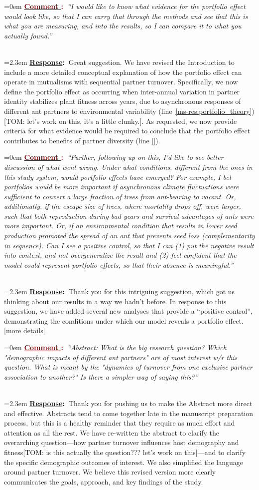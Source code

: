 \documentclass[12pt]{article}
\newcounter{cN}
\newcommand{\comment}[1]{
	\vspace{2em}
	\refstepcounter{cN} %
	\noindent \hangindent=0em \textbf{\textcolor{Maroon}{\uline{Comment \thecN}:~}}\emph{``#1''}
	}
\newcommand{\response}[1]{
	\\[0.25em]
	\hangindent=2.3em \textbf{\textcolor{NavyBlue}{\uline{Response}:~}}#1
	}
\begin{document}
\comment{I would like to know what evidence for the portfolio effect would look like, so that I can carry that through the methods and see that this is what you are measuring, and into the results, so I can compare it to what you actually found.}
\response{Great suggestion. 
	We have revised the Introduction to include a more detailed conceptual explanation of how the portfolio effect can operate in mutualisms with sequential partner turnover. 
	Specifically, we now define the portfolio effect as occurring when inter-annual variation in partner identity stabilizes plant fitness across years, due to asynchronous responses of different ant partners to environmental variability (line~\ref{ms-res:portfolio_theory})[TOM: let's work on this, it's a little clunky.].
	As requested, we now provide criteria for what evidence would be required to conclude that the portfolio effect contributes to benefits of partner diversity (line \ref{}). }

\comment{Further, following up on this, I'd like to see better discussion of what went wrong. 
Under what conditions, different from the ones in this study system, would portfolio effects have emerged? 
For example, I bet portfolios would be more important if asynchronous climate fluctuations were sufficient to convert a large fraction of trees from ant-bearing to vacant. 
Or, additionally, if the escape size of trees, where mortality drops off, were larger, such that both reproduction during bad years and survival advantages of ants were more important.  
Or, if an environmental condition that results in lower seed production promoted the spread of an ant that prevents seed loss (complementarity in sequence).
Can I see a positive control, so that I can (1) put the negative result into context, and not overgeneralize the result and (2) feel confident that the model could represent portfolio effects, so that their absence is meaningful.}
\response{Thank you for this intriguing suggestion, which got us thinking about our results in a way we hadn't before. 
In response to this suggestion, we have added several new analyses that provide a ``positive control'', demonstrating the conditions under which our model reveals a portfolio effect.
[more details]}

\comment{Abstract: What is the big research question? 
Which "demographic impacts of different ant partners" are of most interest w/r this question. 
What is meant by the "dynamics of turnover from one exclusive partner association to another?" Is there a simpler way of saying this?}
\response{Thank you for pushing us to make the Abstract more direct and effective. 
	Abstracts tend to come together late in the manuscript preparation process, but this is a healthy reminder that they require as much effort and attention as all the rest. 
	We have re-written the abstract to clarify the overarching question—how partner turnover influences host demography and fitness[TOM: is this actually the question??? let's work on this]—and to clarify the specific demographic outcomes of interest. 
We also simplified the language around partner turnover.
We believe this revised version more clearly communicates the goals, approach, and key findings of the study.}
\end{document}
